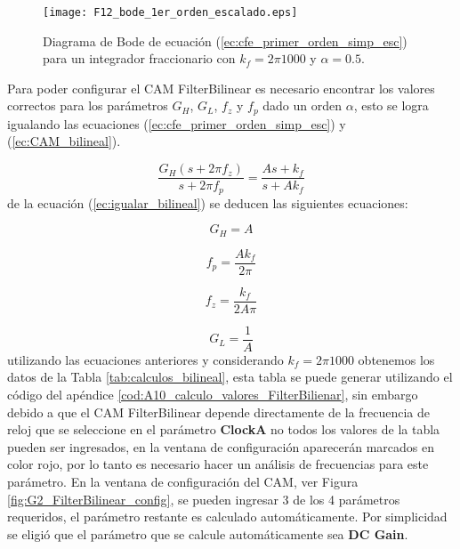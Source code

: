 	\begin{figure}[hbtp]
		\caption{Diagrama de Bode de ecuación (\ref{ec:cfe_primer_orden_simp_esc}) para un integrador fraccionario con $k_{f} = 2\pi 1000$ y  $\alpha = 0.5$.} 
		\label{fig:F12_bode_1er_orden_escalado}
		\centering
		\texttt{[image: F12\_bode\_1er\_orden\_escalado.eps]}
	\end{figure}
	
	 Para poder configurar el CAM FilterBilinear es necesario encontrar los valores correctos para los parámetros $G_{H}$, $G_{L}$, $f_{z}$ y $f_{p}$ dado un orden $\alpha$, esto se logra igualando las ecuaciones (\ref{ec:cfe_primer_orden_simp_esc}) y (\ref{ec:CAM_bilineal}).
	 
	 \begin{equation}
	 \frac{G_{H}(s + 2 \pi f_{z})}{s + 2 \pi f_{p}} = \frac{As + k_{f}}{s + A k_{f}}
	 \label{ec:igualar_bilineal}
	 \end{equation}
	 de la ecuación (\ref{ec:igualar_bilineal}) se deducen las siguientes ecuaciones:
	 
	 \begin{equation}
		 G_{H} = A
		 \label{ec:bilineal_gh}
	 \end{equation}
	 
	 \begin{equation}
	 	f_{p} = \frac{A k_{f}}{2 \pi}
	 	\label{ec:bilineal_fp}
	 \end{equation}
	 
	 \begin{equation}
		f_{z} = \frac{k_{f}}{ 2A \pi}
		\label{ec:bilineal_fz}
	 \end{equation}
	 
	 \begin{equation}
	 G_{L} = \frac{1}{A}
	 \label{ec:bilineal_gl}
	 \end{equation}
	utilizando las ecuaciones anteriores y considerando $k_{f} = 2 \pi 1000$ obtenemos los datos de la Tabla \ref{tab:calculos_bilineal}, esta tabla se puede generar utilizando el código del apéndice \ref{cod:A10_calculo_valores_FilterBilienar}, sin embargo debido a que el CAM FilterBilinear depende directamente de la frecuencia de reloj que se seleccione en el parámetro \textbf{ClockA} no todos los valores de la tabla pueden ser ingresados, en la ventana de configuración aparecerán marcados en color rojo, por lo tanto  es necesario hacer un análisis de frecuencias para este parámetro. En la ventana de configuración del CAM, ver Figura \ref{fig:G2_FilterBilinear_config}, se pueden ingresar 3 de los 4 parámetros requeridos, el parámetro restante es calculado automáticamente. Por simplicidad se eligió que el parámetro que se calcule automáticamente sea \textbf{DC Gain}. 
	   
